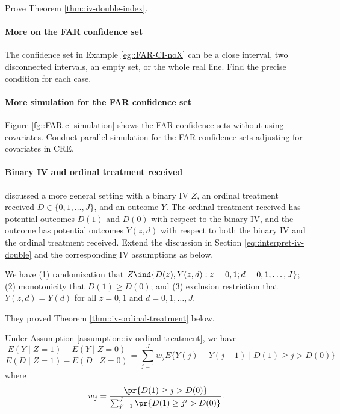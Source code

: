  Prove Theorem \ref{thm::iv-double-index}. 
 


\paragraph{More on the FAR confidence set}\label{para::FAR-CI-cases}

The confidence set in Example \ref{eg::FAR-CI-noX} can be a close interval, two disconnected intervals, an empty set, or the whole real line. Find the precise condition for each case.
 
 
 \paragraph{More simulation for the FAR confidence set}\label{para::FAR-CI-simulation-X}

Figure \ref{fg::FAR-ci-simulation} shows the FAR confidence sets without using covariates. Conduct parallel simulation for 
 the FAR confidence sets adjusting for covariates in CRE. 
 
 
\paragraph{Binary IV and ordinal treatment received}\label{para::iv-ordinal-treatment}

\citet{angrist1995two} discussed a more general setting with a binary IV $Z$, an ordinal treatment received $D \in \{0,1,\ldots, J\}$, and an outcome $Y$. The ordinal treatment received has potential outcomes $D(1)$ and $D(0)$ with respect to the binary IV, and the outcome has potential outcomes $Y(z,d)$ with respect to both the binary IV and the ordinal treatment received. Extend the discussion in Section \ref{eq::interpret-iv-double} and the corresponding IV assumptions as below.

\begin{assumption}\label{assumption::iv-ordinal-treatment}
We have
(1) randomization that $Z\ind \{   D(z),  Y(z,d)  : z=0,1; d = 0,1,\ldots, J \}$; 
(2) monotonicity that $D(1) \geq D(0)$; and
(3) exclusion restriction that $Y(z,d) = Y(d)$ for all $z=0,1$ and $ d = 0,1,\ldots, J $. 
\end{assumption}

They proved Theorem \ref{thm::iv-ordinal-treatment} below.

\begin{theorem}\label{thm::iv-ordinal-treatment}
Under Assumption \ref{assumption::iv-ordinal-treatment}, we have 
$$
\frac{  E(Y\mid Z=1) - E(Y\mid Z=0) }{ E(D\mid Z=1) - E(D\mid Z=0)  }
= \sum_{j=1}^J  w_j E\{  Y(j) - Y(j-1)  \mid D(1) \geq j > D(0) \}
$$
where
$$
w_j = \frac{   \pr\{  D(1) \geq j > D(0)   \}   }{   \sum_{j'=1}^J  \pr\{  D(1) \geq j' > D(0)   \}   }.
$$
\end{theorem}



